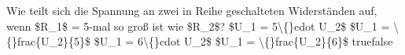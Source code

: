     {Wie teilt sich die Spannung an zwei in Reihe geschalteten Widerständen auf, wenn \$R\_1\$ = 5-mal so groß ist wie \$R\_2\$?}
    {\$U\_1 = 5\textbackslash\{\}cdot U\_2\$}
    {\$U\_1 = \textbackslash\{\}frac\{U\_2\}\{5\}\$}
    {\$U\_1 = 6\textbackslash\{\}cdot U\_2\$}
    {\$U\_1 = \textbackslash\{\}frac\{U\_2\}\{6\}\$}
    {true}{false}